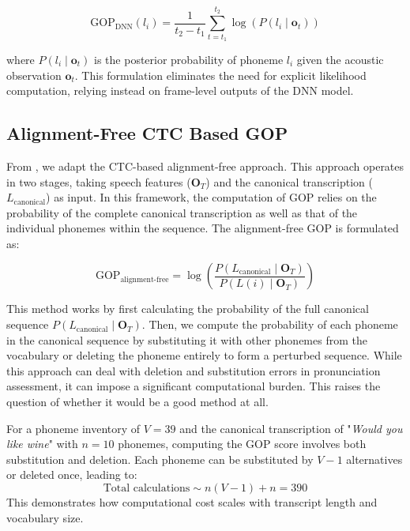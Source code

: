 \documentclass{Interspeech}
\begin{document}
\begin{equation}
\text{GOP}_{\text{DNN}}(l_i) = \frac{1}{t_2 - t_1} \sum_{t=t_1}^{t_2} \log \left( P(l_i \mid \mathbf{o}_t) \right)
\label{eq:gop_dnn}
\end{equation}

where \( P(l_i \mid \mathbf{o}_t) \) is the posterior probability of phoneme \( l_i \) given the acoustic observation \( \mathbf{o}_t \). This formulation eliminates the need for explicit likelihood computation, relying instead on frame-level outputs of the DNN model. 


\subsection{Alignment-Free CTC Based GOP}

From \cite{cao2024framework}, we adapt the CTC-based alignment-free approach. This approach operates in two stages, taking speech features (\( \mathbf{O}_T \)) and the canonical transcription (\( L_{\text{canonical}} \)) as input. In this framework, the computation of GOP relies on the probability of the complete canonical transcription as well as that of the individual phonemes within the sequence.
%
The alignment-free GOP is formulated as:

\begin{equation}
\label{eq3}
\text{GOP}_{\text{alignment-free}} = \log \left( \frac{P(L_{\text{canonical}} \mid \mathbf{O}_T)}{P(L(i) \mid \mathbf{O}_T)} \right)
\end{equation}

This method works by first calculating the probability of the full canonical sequence \( P(L_{\text{canonical}} \mid \mathbf{O}_T) \). Then, we compute the probability of each phoneme in the canonical sequence by substituting it with other phonemes from the vocabulary or deleting the phoneme entirely to form a perturbed sequence. While this approach can deal with deletion and substitution errors in pronunciation assessment, it can impose a significant computational burden. This raises the question of whether it would be a good method at all. 

For a phoneme inventory of \(V = 39\) and the canonical transcription of "\textit{Would you like wine}"  with \(n = 10\) phonemes, computing the GOP score involves both substitution and deletion. Each phoneme can be substituted by \(V - 1\) alternatives or deleted once, leading to:
\[
\text{Total calculations} \sim n(V - 1) + n = 390
\]
This demonstrates how computational cost scales with transcript length and vocabulary size.
\end{document}
